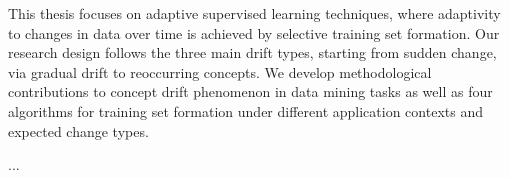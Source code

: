 This thesis focuses on adaptive supervised learning techniques, where adaptivity to changes in data over time is achieved by selective training set formation. 
Our research design follows the three main drift types, starting from sudden change, via gradual drift to reoccurring concepts.
We develop methodological contributions to concept drift phenomenon in data mining tasks as well as four algorithms for training set formation under different application contexts and expected change types.

...
